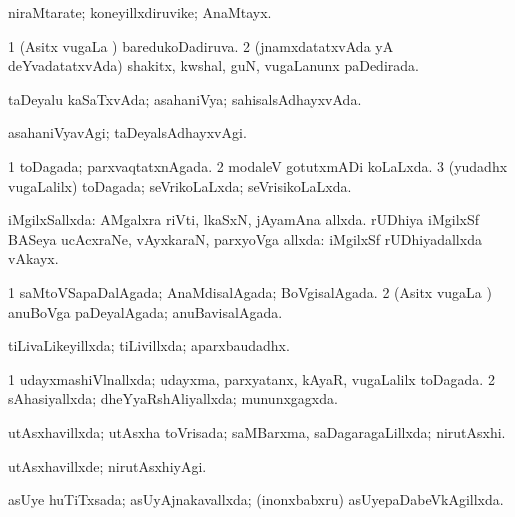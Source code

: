 {\bentry
{} 
\gl{\nA}
\expl{}
\bmng
 niraMtarate; koneyillxdiruvike; AnaMtayx. 
\emng
\eentry

\bentry
{} 
\gl{\gu}
\expl{}
\bmng
\bnum
\num{1} (Asitx \mo vugaLa \vi) baredukoDadiruva. 
\num{2} (jnamxdatatxvAda yA deYvadatatxvAda) shakitx, kwshal, guN, \mo vugaLanunx paDedirada. 
\enum
\emng
\eentry

\bentry
{} 
\gl{\gu}
\expl{}
\bmng
taDeyalu kaSaTxvAda; asahaniVya; sahisalsAdhayxvAda. 
\emng
\eentry

\bentry
{} 
\gl{\kirxvi}
\expl{}
\bmng
asahaniVyavAgi; taDeyalsAdhayxvAgi. 
\emng
\eentry

\bentry
{} 
\gl{\gu}
\expl{}
\bmng
\bnum
\num{1} toDagada; parxvaqtatxnAgada. 
\num{2} modaleV gotutxmADi koLaLxda. 
\num{3} (yudadhx \mo vugaLalilx) toDagada; seVrikoLaLxda; seVrisikoLaLxda. 
\enum
\emng
\eentry

\bentry
{} 
\gl{\gu}
\expl{}
\bmng
 iMgilxSallxda: 
\banum
{} AMgalxra riVti, lkaSxN, jAyamAna allxda. 
 rUDhiya iMgilxSf BASeya ucAcxraNe, vAyxkaraN, parxyoVga allxda:  iMgilxSf rUDhiyadallxda vAkayx. 
\eanum
\emng
\eentry

\bentry
{} 
\gl{\gu}
\expl{}
\bmng
\bnum
\num{1} saMtoVSapaDalAgada; AnaMdisalAgada; BoVgisalAgada. 
\num{2} (Asitx \mo vugaLa \vi) anuBoVga paDeyalAgada; anuBavisalAgada. 
\enum
\emng
\eentry

\bentry
{} 
\gl{\gu}
\expl{}
\bmng
 tiLivaLikeyillxda; tiLivillxda; aparxbaudadhx. 
\emng
\eentry

\bentry
{} 
\gl{\gu}
\expl{}
\bmng
\bnum
\num{1} udayxmashiVlnallxda; udayxma, parxyatanx, kAyaR, \mo vugaLalilx toDagada. 
\num{2} sAhasiyallxda; dheYyaRshAliyallxda; mununxgagxda. 
\enum
\emng
\eentry

\bentry
{} 
\gl{\gu}
\expl{}
\bmng
 utAsxhavillxda; utAsxha toVrisada; saMBarxma, saDagaragaLillxda; nirutAsxhi. 
\emng
\eentry

\bentry
{} 
\gl{\kirxvi}
\expl{}
\bmng
utAsxhavillxde; nirutAsxhiyAgi. 
\emng
\eentry

\bentry
{} 
\gl{\gu}
\expl{}
\bmng
 asUye huTiTxsada; asUyAjnakavallxda; (inonxbabxru) asUyepaDabeVkAgillxda. 
\emng
\eentry

}
